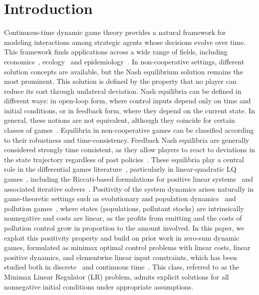 \documentclass[letterpaper, 10 pt, conference]{ieeeconf}
\theoremstyle{definition}
\begin{document}
\section{Introduction}
\vspace{-2mm}
Continuous-time dynamic game theory provides a natural framework for modeling interactions among strategic agents whose decisions evolve over time. This framework finds applications across a wide range of fields, including economics~\cite{app_econom}, ecology~\cite{app_eeco} and epidemiology~\cite{app_epi}. 
In non-cooperative settings, different solution concepts are available, but the Nash equilibrium solution remains the most prominent. This solution is defined by the property that no player can reduce its cost through unilateral deviation. Nash equilibria can be defined in different ways: in open-loop form, where control inputs depend only on time and initial conditions, or in feedback form, where they depend on the current state. In general, these notions are not equivalent, although they coincide for certain classes of games~\cite{Fershtman, ref_open_feedback}. Equilibria in non-cooperative games can be classified according to their robustness and time-consistency. Feedback Nash equilibria are generally considered strongly time consistent, as they allow players to react to deviations in the state trajectory regardless of past policies~\cite{Basar_eq}. These equilibria play a central role in the differential games literature~\cite{basar}, particularly in linear-quadratic LQ games~\cite{basar2, ref9, ref11_engwerda, takashi_ref}, including the Riccati-based formulations for positive linear systems~\cite{azebedo-jank} and associated iterative solvers~\cite{Ivanov}. %
Positivity of the system dynamics arises naturally in game-theoretic settings such as evolutionary and population dynamics~\cite{evol_games} and pollution games~\cite{yu2024research}, where states (populations, pollutant stocks) are intrinsically nonnegative and costs are linear, as the profits from emitting and the costs of pollution control grow in proportion to the amount involved. In this paper, we exploit this positivity property and build on prior work in zero-sum dynamic games, formulated as minimax optimal control problems with linear costs, linear positive dynamics, and elementwise linear input constraints, which has been studied both in discrete~\cite{AlbaEmmaAnders} and continuous time~\cite{LR_paperII}. This class, referred to as the Minimax Linear Regulator (LR) problem, admits explicit solutions for all nonnegative initial conditions under appropriate assumptions. 
\end{document}

